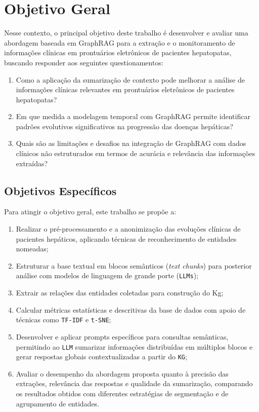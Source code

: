 \section{Objetivo Geral}

 Nesse contexto, o principal objetivo deste trabalho é desenvolver e avaliar uma abordagem baseada em GraphRAG para a extração e o monitoramento de informações clínicas em prontuários eletrônicos de pacientes hepatopatas, buscando responder aos seguintes questionamentos:

\begin{enumerate}
    \item Como a aplicação da sumarização de contexto pode melhorar a análise de informações clínicas relevantes em prontuários eletrônicos de pacientes hepatopatas? 
    \item Em que medida a modelagem temporal com GraphRAG permite identificar padrões evolutivos significativos na progressão das doenças hepáticas?  
    \item Quais são as limitações e desafios na integração de GraphRAG com dados clínicos não estruturados em termos de acurácia e relevância das informações extraídas?
\end{enumerate}

\subsection{Objetivos Específicos}

Para atingir o objetivo geral, este trabalho se propõe a:

\begin{enumerate}
    \item Realizar o pré-processamento e a anonimização das evoluções clínicas de pacientes hepáticos, aplicando técnicas de reconhecimento de entidades nomeadas;
    
    \item Estruturar a base textual em blocos semânticos (\textit{text chunks}) para posterior análise com modelos de linguagem de grande porte (\texttt{LLMs});
    
    \item Extrair as relações das entidades coletadas para construção do Kg;
    
    \item Calcular métricas estatísticas e descritivas da base de dados com apoio de técnicas como \texttt{TF-IDF} e \texttt{t-SNE};
    
    \item Desenvolver e aplicar prompts específicos para consultas semânticas, permitindo ao \texttt{LLM} sumarizar informações distribuídas em múltiplos blocos e gerar respostas globais contextualizadas a partir do \texttt{KG};
    
    \item Avaliar o desempenho da abordagem proposta quanto à precisão das extrações, relevância das respostas e qualidade da sumarização, comparando os resultados obtidos com diferentes estratégias de segmentação e de agrupamento de entidades.
    
\end{enumerate}


